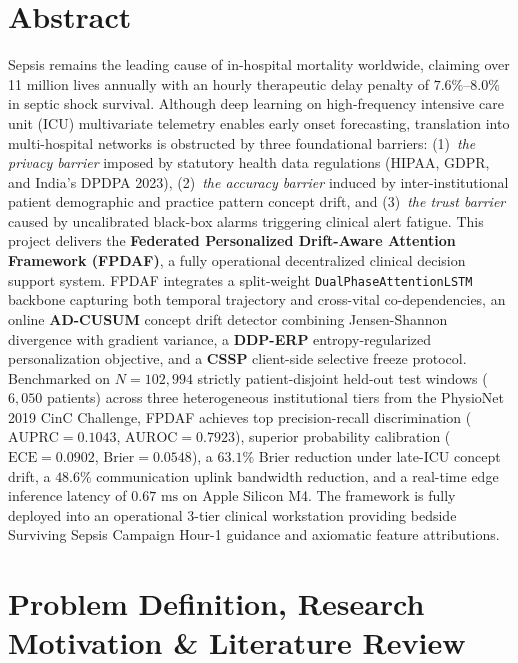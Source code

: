 \documentclass[11pt, a4paper]{article}
\begin{document}
\section{Abstract}
\noindent
Sepsis remains the leading cause of in-hospital mortality worldwide, claiming over 11 million lives annually with an hourly therapeutic delay penalty of $7.6\%$--$8.0\%$ in septic shock survival. Although deep learning on high-frequency intensive care unit (ICU) multivariate telemetry enables early onset forecasting, translation into multi-hospital networks is obstructed by three foundational barriers: (1)~\textit{the privacy barrier} imposed by statutory health data regulations (HIPAA, GDPR, and India's DPDPA 2023), (2)~\textit{the accuracy barrier} induced by inter-institutional patient demographic and practice pattern concept drift, and (3)~\textit{the trust barrier} caused by uncalibrated black-box alarms triggering clinical alert fatigue. This project delivers the \textbf{Federated Personalized Drift-Aware Attention Framework (FPDAF)}, a fully operational decentralized clinical decision support system. FPDAF integrates a split-weight \texttt{DualPhaseAttentionLSTM} backbone capturing both temporal trajectory and cross-vital co-dependencies, an online \textbf{AD-CUSUM} concept drift detector combining Jensen-Shannon divergence with gradient variance, a \textbf{DDP-ERP} entropy-regularized personalization objective, and a \textbf{CSSP} client-side selective freeze protocol. Benchmarked on $N = 102,994$ strictly patient-disjoint held-out test windows ($6,050$ patients) across three heterogeneous institutional tiers from the PhysioNet 2019 CinC Challenge, FPDAF achieves top precision-recall discrimination ($\text{AUPRC} = 0.1043$, $\text{AUROC} = 0.7923$), superior probability calibration ($\text{ECE} = 0.0902$, $\text{Brier} = 0.0548$), a $63.1\%$ Brier reduction under late-ICU concept drift, a $48.6\%$ communication uplink bandwidth reduction, and a real-time edge inference latency of $0.67\text{ ms}$ on Apple Silicon M4. The framework is fully deployed into an operational 3-tier clinical workstation providing bedside Surviving Sepsis Campaign Hour-1 guidance and axiomatic feature attributions.

\section{Problem Definition, Research Motivation \& Literature Review}
\end{document}

